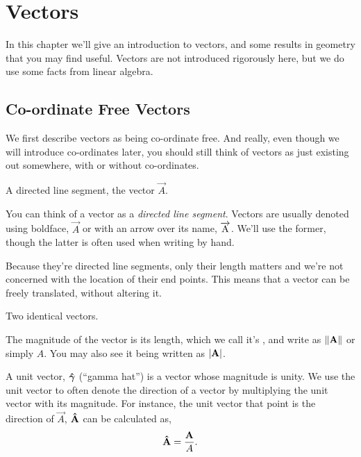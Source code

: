 \setlength{\chnumsep}{14em}
\chapter{Vectors}

\begin{overview}
In this chapter we'll give an introduction to vectors, and some results in
geometry that you may find useful. Vectors are not introduced rigorously here,
but we do use some facts from linear algebra.
\end{overview}

\section{Co-ordinate Free Vectors}

We first describe vectors as being co-ordinate free. And really, even
though we will introduce co-ordinates later, you should still
think of vectors as just existing out somewhere, with or without
co-ordinates.

\begin{marginfigure}
\caption{A directed line segment, the vector \(\vec{A}\).}
\end{marginfigure}

You can think of a  vector as a \emph{directed line segment}.
Vectors are usually denoted using boldface, \(\vec{A}\) or with an arrow over its name,
\(\overrightarrow{\mathrm{A}}\). We'll use the former, though the latter is often used when writing by hand.


Because they're directed line segments, only their length matters and
we’re not concerned with the location of their end points. This means that a
vector can be freely translated, without altering it.

\begin{marginfigure}
\caption{Two identical vectors.}
\end{marginfigure}

The magnitude of the vector is its length, which we call it's , and write
as \(\norm{\mathbf{\boldsymbol{A}}}\) or simply \(A\). You may also see it being written as \(\abs{\mathbf{\boldsymbol{A}}}\).

A unit vector, \(\mathbf{\boldsymbol{\hat{\gamma}}}\) (“gamma hat”) is a vector whose magnitude is unity. We use the unit vector to
often denote the direction of a vector by multiplying the unit vector with its magnitude.
For instance, the unit vector that point is the direction of \(\vec{A}\), \(\mathbf{\boldsymbol{\hat{A}}}\) can be calculated as,
\[
\mathbf{\boldsymbol{\hat{A}}} = \frac{\mathbf{\boldsymbol{A}}}{A}.
\]
